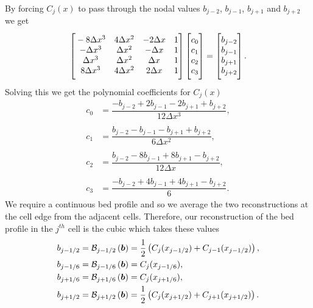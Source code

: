 By forcing $C_j(x)$ to pass through the nodal values $b_{j-2}$, $b_{j-1}$, $b_{j+1}$ and $b_{j+2}$ we get
\begin{equation*}
\begin{bmatrix}
\TM -8\Delta x^3 & 4\Delta x^2  & -2\Delta x & 1\\
-\Delta x^3 & \Delta x^2  &-\Delta x & 1\\
\Delta x^3 & \Delta x^2  & \Delta x & 1\\
8\Delta x^3 & 4\Delta x^2  & 2\Delta x & 1 \BM 
\end{bmatrix}
\begin{bmatrix}
 \TM c_0 \\ c_1 \\ c_2 \\ c_3  \BM\end{bmatrix} =  \begin{bmatrix}
 \TM b_{j-2} \\ b_{j-1}\\ b_{j+1} \\ b_{j+2} \BM
\end{bmatrix}.
\end{equation*}
Solving this we get the polynomial coefficients for $C_j(x)$
\begin{align*}
c_0 &=  \dfrac{-b_{j-2} + 2b_{j-1} - 2 b_{j+1} + b_{j+2}}{12 \Delta x^3},\\ \\
c_1 &=  \dfrac{b_{j-2} - b_{j-1} - b_{j+1} + b_{j+2}}{6 \Delta x^2},\\ \\
c_2 &=  \dfrac{b_{j-2} - 8b_{j-1} + 8 b_{j+1} - b_{j+2}}{12 \Delta x},\\ \\
c_3 &=  \dfrac{-b_{j-2}  + 4b_{j-1} + 4 b_{j+1} - b_{j+2}}{6}.
\end{align*}
We require a continuous bed profile and so we average the two reconstructions at the cell edge from the adjacent cells. Therefore, our reconstruction of the bed profile in the $j^{th}$ cell is the cubic which takes these values
\begin{align*}
b_{j-1/2} &=  \mathcal{B}_{j-1/2}\left(\boldsymbol{b}\right) =  \frac{1}{2}\left( C_j(x_{j-1/2}) + C_{j-1}(x_{j-1/2})\right),\\
b_{j-1/6} &=  \mathcal{B}_{j-1/6}\left(\boldsymbol{b}\right) =  C_j(x_{j-1/6}),\\
b_{j+1/6} &=  \mathcal{B}_{j+1/6}\left(\boldsymbol{b}\right) =  C_j(x_{j+1/6}),\\
b_{j+1/2} &=  \mathcal{B}_{j+1/2}\left(\boldsymbol{b}\right) =  \frac{1}{2}\left( C_j(x_{j+1/2}) + C_{j+1}(x_{j+1/2})\right).
\end{align*}


